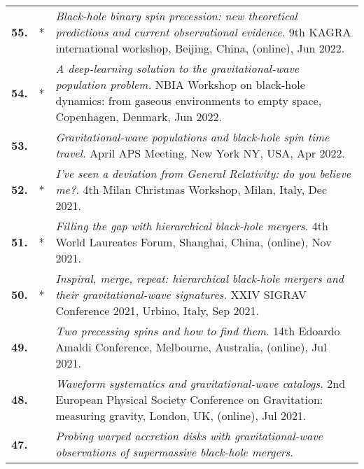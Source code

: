{\begin{longtable}{rp{0.3cm}p{15.8cm}}
%
\textbf{55.} & * & \textit{Black-hole binary spin precession: new theoretical predictions and current observational evidence.}
\newline{}
9th KAGRA international workshop, Beijing, China, (online), Jun 2022.
\vspace{0.05cm}\\
%
\textbf{54.} & * & \textit{A deep-learning solution to the gravitational-wave population problem.}
\newline{}
NBIA Workshop on black-hole dynamics: from gaseous environments to empty space, Copenhagen, Denmark, Jun 2022.
\vspace{0.05cm}\\
%
\textbf{53.} &  & \textit{Gravitational-wave populations and black-hole spin time travel.}
\newline{}
April APS Meeting, New York NY, USA, Apr 2022.
\vspace{0.05cm}\\
%
\textbf{52.} & * & \textit{I've seen a deviation from General Relativity: do you believe me?.}
\newline{}
4th Milan Christmas Workshop, Milan, Italy, Dec 2021.
\vspace{0.05cm}\\
%
\textbf{51.} & * & \textit{Filling the gap with hierarchical black-hole mergers.}
\newline{}
4th World Laureates Forum, Shanghai, China, (online), Nov 2021.
\vspace{0.05cm}\\
%
\textbf{50.} & * & \textit{Inspiral, merge, repeat: hierarchical black-hole mergers and their gravitational-wave signatures.}
\newline{}
XXIV SIGRAV Conference 2021, Urbino, Italy, Sep 2021.
\vspace{0.05cm}\\
%
\textbf{49.} &  & \textit{Two precessing spins and how to find them.}
\newline{}
14th Edoardo Amaldi Conference, Melbourne, Australia, (online), Jul 2021.
\vspace{0.05cm}\\
%
\textbf{48.} &  & \textit{Waveform systematics and gravitational-wave catalogs.}
\newline{}
2nd European Physical Society Conference on Gravitation: measuring gravity, London, UK, (online), Jul 2021.
\vspace{0.05cm}\\
%
\textbf{47.} &  & \textit{Probing warped accretion disks with gravitational-wave observations of supermassive black-hole mergers.}

\end{longtable}}
